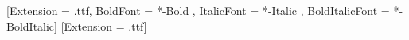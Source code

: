 [Extension = .ttf,
    BoldFont = *-Bold ,
    ItalicFont = *-Italic ,
    BoldItalicFont = *-BoldItalic]
[Extension = .ttf]

\newcommand\nwithdescender{{\medieval }}
\newcommand\Eunical{{\medieval }}
\newcommand\Eclosedunical{{\medieval }}
\newcommand\vbart{{\normalfont \textvbaraccent{\medieval ꞇ}}}

\newcommand{\nom}{\textsc{n}}
\newcommand{\gen}{\textsc{g}}
\newcommand{\dat}{\textsc{d}}
\newcommand{\acc}{\textsc{a}}
\newcommand{\mas}{\textsc{m}}
\newcommand{\neu}{\textsc{neu}}
\newcommand{\fem}{\textsc{f}}
\newcommand{\pl}{\textsc{p}}
\newcommand{\sing}{\textsc{s}}
\newcommand{\sub}{\textsc{sub}}
\newcommand{\DEF}{\textsc{def}}

\makeatletter
{}
\makeatletter


